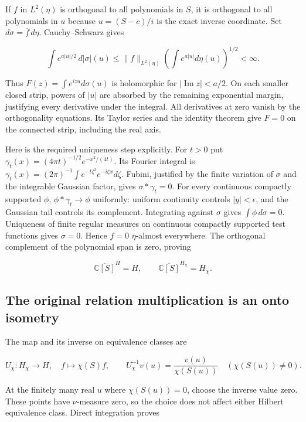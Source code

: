If \(f\) in \(L^2(\eta)\) is orthogonal to all polynomials in \(S\), it is orthogonal to all polynomials in \(u\) because \(u=(S-c)/i\) is the exact inverse coordinate. Set \(d\sigma=\overline f\,d\eta\). Cauchy--Schwarz gives

\[
\int e^{a|u|/2}\,d|\sigma|(u)
\le \|f\|_{L^2(\eta)}\left(\int e^{a|u|}d\eta(u)\right)^{1/2}<\infty.
\tag{CR4}
\]

Thus \(F(z)=\int e^{izu}d\sigma(u)\) is holomorphic for \(|\operatorname{Im}z|<a/2\). On each smaller closed strip, powers of \(|u|\) are absorbed by the remaining exponential margin, justifying every derivative under the integral. All derivatives at zero vanish by the orthogonality equations. Its Taylor series and the identity theorem give \(F=0\) on the connected strip, including the real axis.

Here is the required uniqueness step explicitly. For \(t>0\) put \(\gamma_t(x)=(4\pi t)^{-1/2}e^{-x^2/(4t)}\). Its Fourier integral is \(\gamma_t(x)=(2\pi)^{-1}\int e^{-t\zeta^2}e^{-i\zeta x}d\zeta\). Fubini, justified by the finite variation of \(\sigma\) and the integrable Gaussian factor, gives \(\sigma*\gamma_t=0\). For every continuous compactly supported \(\phi\), \(\phi*\gamma_t\to\phi\) uniformly: uniform continuity controls \(|y|<\epsilon\), and the Gaussian tail controls its complement. Integrating against \(\sigma\) gives \(\int\phi\,d\sigma=0\). Uniqueness of finite regular measures on continuous compactly supported test functions gives \(\sigma=0\). Hence \(f=0\) \(\eta\)-almost everywhere. The orthogonal complement of the polynomial span is zero, proving

\[
\overline{\mathbb C[S]}^{H}=H,\qquad
\overline{\mathbb C[S]}^{H_\chi}=H_\chi.
\tag{CR5}
\]

\subsection{The original relation multiplication is an onto isometry}\label{the-original-relation-multiplication-is-an-onto-isometry}

The map and its inverse on equivalence classes are

\[
U_\chi:H_\chi\longrightarrow H,\quad f\longmapsto\chi(S)f,
\qquad
U_\chi^{-1}v(u)=\frac{v(u)}{\chi(S(u))}\quad(\chi(S(u))\ne0).
\tag{CR6}
\]

At the finitely many real \(u\) where \(\chi(S(u))=0\), choose the inverse value zero. These points have \(\nu\)-measure zero, so the choice does not affect either Hilbert equivalence class. Direct integration proves

